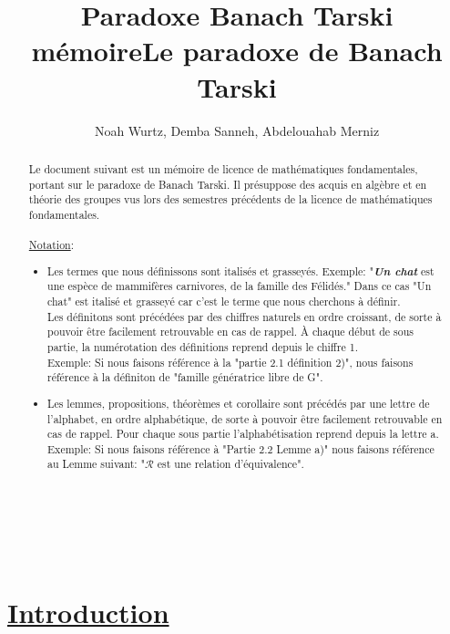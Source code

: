 \documentclass{article}
\title{Paradoxe Banach Tarski mémoire}
\date{}
\title{Le paradoxe de Banach Tarski}
\author{Noah Wurtz, Demba Sanneh, Abdelouahab Merniz}
\begin{document}
\maketitle

\begin{abstract}
Le document suivant est un mémoire de licence de mathématiques fondamentales, portant sur le paradoxe de Banach Tarski. Il présuppose des acquis en algèbre et en théorie des groupes vus lors des semestres précédents de la licence de mathématiques fondamentales.\\~\\

\underline{Notation}:
\begin{itemize}
    \item Les termes que nous définissons sont italisés et grasseyés. 
Exemple: "\textit{\textbf{Un chat}} est une espèce de mammifères carnivores, de la famille des Félidés." Dans ce cas "Un chat" est italisé et grasseyé car c'est le terme que nous cherchons à définir.\\
Les définitons sont précédées par des chiffres naturels en ordre croissant, de sorte à pouvoir être facilement retrouvable en cas de rappel. À chaque début de sous partie, la numérotation des définitions reprend depuis le chiffre 1.\\
Exemple: Si nous faisons référence à la  "partie 2.1 définition 2)", nous faisons référence à la définiton de "famille génératrice libre de G".
    \item Les lemmes, propositions, théorèmes et corollaire sont précédés par une lettre de l'alphabet, en ordre alphabétique, de sorte à pouvoir être facilement retrouvable en cas de rappel. Pour chaque sous partie l'alphabétisation reprend depuis la lettre a.\\
    Exemple: Si nous faisons référence à "Partie 2.2 Lemme a)" nous faisons référence au Lemme suivant: "$\mathcal{R}$ est une relation d'équivalence".
    
\end{itemize}


\end{abstract}
\\~\\
\section{\underline{Introduction}}
\end{document}
